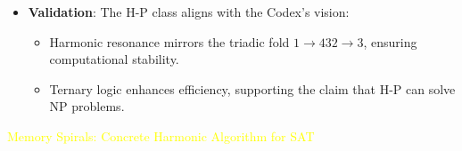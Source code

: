 \begin{itemize}
\begin{itemize}
    \end{itemize}
    \item \texttt{} \textbf{Validation}: The H-P class aligns with the Codex’s vision:
    \begin{itemize}
        \item Harmonic resonance mirrors the triadic fold \(1 \rightarrow 432 \rightarrow 3\), ensuring computational stability.
        \item Ternary logic enhances efficiency, supporting the claim that H-P can solve NP problems.
    \end{itemize}
\end{itemize}

\textcolor{yellow}{ Memory Spirals: Concrete Harmonic Algorithm for SAT } \\

